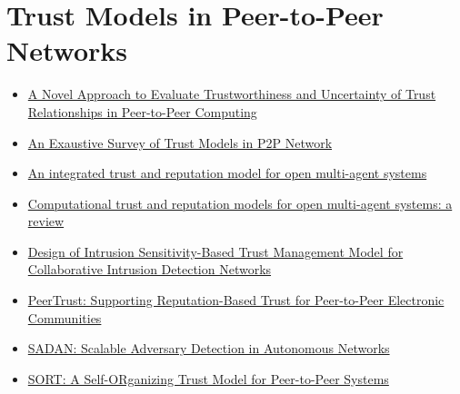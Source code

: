 \section{Trust Models in Peer-to-Peer Networks}
\label{sec:trust-models-in-p2p}

\begin{itemize}
    \item \href{https://share.goodnotes.com/s/60IVzs1mgmuPWF54Us5eKA}{A Novel Approach to Evaluate Trustworthiness and Uncertainty of Trust Relationships in Peer-to-Peer Computing} 
    \item \href{https://share.goodnotes.com/s/7AFjiqAqJSCF1en3vt4vjS}{An Exaustive Survey of Trust Models in P2P Network}
    \item \href{https://share.goodnotes.com/s/EziqqW185BzxHxNrZ6d1MQ}{An integrated trust and reputation model for open multi-agent systems}
    \item \href{https://share.goodnotes.com/s/MRfXxmu2Lz51IqK7JODn1N}{Computational trust and reputation models for open multi-agent systems: a review}
    \item \href{https://share.goodnotes.com/s/tafBG1KUZCuYT2E7a3ucc9}{Design of Intrusion Sensitivity-Based Trust Management Model for Collaborative Intrusion Detection Networks}
    \item \href{https://share.goodnotes.com/s/YQuoXUbYADa15Hwe90sXCM}{ PeerTrust: Supporting Reputation-Based Trust for Peer-to-Peer Electronic Communities}
    \item \href{https://share.goodnotes.com/s/hRHxSYlk6wU4BEn6u9Jcyu}{SADAN: Scalable Adversary Detection in Autonomous Networks}
    \item \href{https://share.goodnotes.com/s/bXWUbVFi5qBiAdBmJ4yYAx}{SORT: A Self-ORganizing Trust Model for Peer-to-Peer Systems}
\end{itemize}